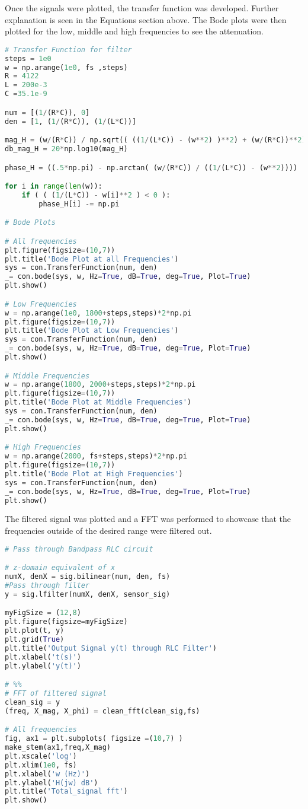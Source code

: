 \documentclass[12pt]{report}
\begin{document}
Once the signals were plotted, the transfer function was developed. Further explanation is seen in the Equations section above. The Bode plots were then plotted for the low, middle and high frequencies to see the attenuation.

\begin{lstlisting}[language=Python, caption= Transfer Function and Bode Plots]
# Transfer Function for filter 
steps = 1e0
w = np.arange(1e0, fs ,steps)
R = 4122
L = 200e-3
C =35.1e-9

num = [(1/(R*C)), 0]
den = [1, (1/(R*C)), (1/(L*C))]

mag_H = (w/(R*C)) / np.sqrt(( ((1/(L*C)) - (w**2) )**2) + (w/(R*C))**2)
db_mag_H = 20*np.log10(mag_H)

phase_H = ((.5*np.pi) - np.arctan( (w/(R*C)) / ((1/(L*C)) - (w**2)))) 

for i in range(len(w)):
    if ( ( (1/(L*C)) - w[i]**2 ) < 0 ):
        phase_H[i] -= np.pi

# Bode Plots

# All frequencies
plt.figure(figsize=(10,7))
plt.title('Bode Plot at all Frequencies')
sys = con.TransferFunction(num, den)
_= con.bode(sys, w, Hz=True, dB=True, deg=True, Plot=True)
plt.show()

# Low Frequencies
w = np.arange(1e0, 1800+steps,steps)*2*np.pi
plt.figure(figsize=(10,7))
plt.title('Bode Plot at Low Frequencies')
sys = con.TransferFunction(num, den)
_= con.bode(sys, w, Hz=True, dB=True, deg=True, Plot=True)
plt.show()

# Middle Frequencies
w = np.arange(1800, 2000+steps,steps)*2*np.pi
plt.figure(figsize=(10,7))
plt.title('Bode Plot at Middle Frequencies')
sys = con.TransferFunction(num, den)
_= con.bode(sys, w, Hz=True, dB=True, deg=True, Plot=True)
plt.show()

# High Frequencies
w = np.arange(2000, fs+steps,steps)*2*np.pi
plt.figure(figsize=(10,7))
plt.title('Bode Plot at High Frequencies')
sys = con.TransferFunction(num, den)
_= con.bode(sys, w, Hz=True, dB=True, deg=True, Plot=True)
plt.show()
\end{lstlisting}

The filtered signal was plotted and a FFT was performed to showcase that the frequencies outside of the desired range were filtered out.

\begin{lstlisting}[language=Python, caption= Filtered Signal and FFT]
# Pass through Bandpass RLC circuit 

# z-domain equivalent of x
numX, denX = sig.bilinear(num, den, fs)
#Pass through filter
y = sig.lfilter(numX, denX, sensor_sig)

myFigSize = (12,8)
plt.figure(figsize=myFigSize)
plt.plot(t, y)
plt.grid(True)
plt.title('Output Signal y(t) through RLC Filter')
plt.xlabel('t(s)')
plt.ylabel('y(t)')

# %%
# FFT of filtered signal
clean_sig = y
(freq, X_mag, X_phi) = clean_fft(clean_sig,fs) 

# All frequencies
fig, ax1 = plt.subplots( figsize =(10,7) )
make_stem(ax1,freq,X_mag)
plt.xscale('log')
plt.xlim(1e0, fs)
plt.xlabel('w (Hz)')
plt.ylabel('H(jw) dB')
plt.title('Total_signal fft')
plt.show()
\end{lstlisting}
\end{document}
